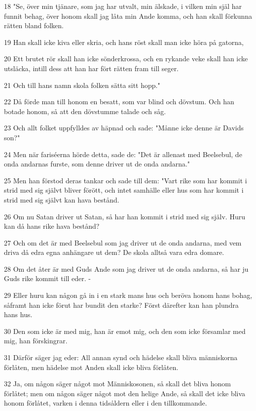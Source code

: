 \par 18 "Se, över min tjänare, som jag har utvalt, min älskade, i vilken min själ har funnit behag, över honom skall jag låta min Ande komma, och han skall förkunna rätten bland folken.
\par 19 Han skall icke kiva eller skria, och hans röst skall man icke höra på gatorna,
\par 20 Ett brutet rör skall han icke sönderkrossa, och en rykande veke skall han icke utsläcka, intill dess att han har fört rätten fram till seger.
\par 21 Och till hans namn skola folken sätta sitt hopp."
\par 22 Då förde man till honom en besatt, som var blind och dövstum. Och han botade honom, så att den dövstumme talade och såg.
\par 23 Och allt folket uppfylldes av häpnad och sade: "Månne icke denne är Davids son?"
\par 24 Men när fariséerna hörde detta, sade de: "Det är allenast med Beelsebul, de onda andarnas furste, som denne driver ut de onda andarna."
\par 25 Men han förstod deras tankar och sade till dem: "Vart rike som har kommit i strid med sig självt bliver förött, och intet samhälle eller hus som har kommit i strid med sig självt kan hava bestånd.
\par 26 Om nu Satan driver ut Satan, så har han kommit i strid med sig själv. Huru kan då hans rike hava bestånd?
\par 27 Och om det är med Beelsebul som jag driver ut de onda andarna, med vem driva då edra egna anhängare ut dem? De skola alltså vara edra domare.
\par 28 Om det åter är med Guds Ande som jag driver ut de onda andarna, så har ju Guds rike kommit till eder. -
\par 29 Eller huru kan någon gå in i en stark mans hus och beröva honom hans bohag, såframt han icke förut har bundit den starke? Först därefter kan han plundra hans hus.
\par 30 Den som icke är med mig, han är emot mig, och den som icke församlar med mig, han förskingrar.
\par 31 Därför säger jag eder: All annan synd och hädelse skall bliva människorna förlåten, men hädelse mot Anden skall icke bliva förlåten.
\par 32 Ja, om någon säger något mot Människosonen, så skall det bliva honom förlåtet; men om någon säger något mot den helige Ande, så skall det icke bliva honom förlåtet, varken i denna tidsåldern eller i den tillkommande.
